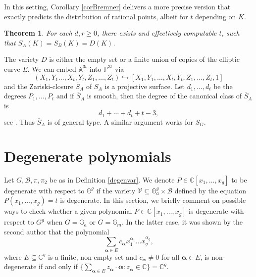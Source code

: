 \documentclass[12pt, reqno]{amsart}
\newcommand{\G}{\mathbb{G}}
\renewcommand{\vec}[1]{\mathbf{#1}}
\renewcommand{\vec}{\bm}
\newtheorem{thm}[theorem]{Theorem}
\theoremstyle{remark}
\theoremstyle{definition}
\numberwithin{equation}{section}
\begin{document}
In this setting, Corollary \ref{corBremner} delivers a more precise version that exactly predicts the distribution of rational points, albeit for $t$ depending on $K$. 

\begin{thm}\label{BombieriLang}
   For each $d,r \geq 0$, there exists and effectively computable $t$, such that $S_A(K) =S_B(K)=  D(K)$.  
\end{thm}




The variety $D$ is either the empty set or a finite union of copies of the elliptic curve $E$. 
We can embed $\mathbb{A}^{3t}$ into $\mathbb{P}^{3t}$ via 
$$(X_1,Y_1 \dots ,X_t, Y_t, Z_1, \dots, Z_t) \hookrightarrow [X_1,Y_1,\dots, X_t, Y_t,Z_1, \dots, Z_t, 1] $$
and the Zariski-closure $\overline{S}_A$ of $S_A$ is a projective surface. Let $d_1, \dots, d_t$ be the degrees $P_1, \dots, P_t$ and if $\overline{S}_A$ is smooth, then the degree of the canonical class of $\overline{S}_A$ is 
$$d_1 + \cdots + d_t + t- 3 , $$
see \cite[Examples 5.1.1]{HindrySilverman}. Thus $\overline{S}_A$ is of general type. A similar argument works for $S_G$. %


\section{Degenerate polynomials} \label{Appb}


Let $G, \mathcal{B}, \pi, \pi_2$ be as in Definition \ref{degenvar}.   We denote $P \in \mathbb{C}[x_1, \dots, x_g]$ to be degenerate with respect to $\mathbb{G}^g$ if the variety $\mathcal{V} \subseteq \mathbb{G}_a^g \times \mathcal{B}$ defined by the equation $P(x_1, \dots, x_g) = t$ is degenerate.   In this section, we briefly comment on possible ways to check whether a given polynomial $P \in \mathbb{C}[x_1, \dots, x_g]$ is degenerate with respect to $G^g$ when $G = \G_a$ or $G = \G_m$. In the latter case, it was shown by the second author \cite{Mu2024a} that the polynomial
\[ \sum_{\vec{\alpha} \in E} c_{\vec{\alpha}} x_1^{\alpha_1} \dots x_g^{\alpha_g}, \]
where $E \subseteq \mathbb{C}^g$ is a finite, non-empty set and $c_{\vec{\alpha}} \neq 0$ for all $\vec{\alpha} \in E$, is non-degenerate if and only if $\{\sum_{\vec{\alpha} \in E} z_{\vec{\alpha}} \cdot \vec{\alpha} : z_{\vec{\alpha}} \in \mathbb{C} \} = \mathbb{C}^g$. 
\end{document}
